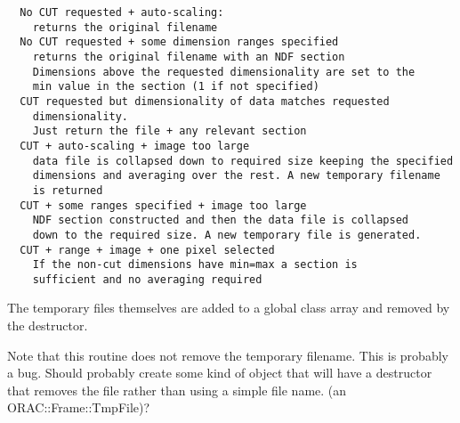 \begin{description}
\begin{verbatim}
  No CUT requested + auto-scaling:
    returns the original filename
  No CUT requested + some dimension ranges specified
    returns the original filename with an NDF section
    Dimensions above the requested dimensionality are set to the
    min value in the section (1 if not specified)
  CUT requested but dimensionality of data matches requested
    dimensionality.
    Just return the file + any relevant section
  CUT + auto-scaling + image too large
    data file is collapsed down to required size keeping the specified
    dimensions and averaging over the rest. A new temporary filename
    is returned
  CUT + some ranges specified + image too large
    NDF section constructed and then the data file is collapsed
    down to the required size. A new temporary file is generated.
  CUT + range + image + one pixel selected
    If the non-cut dimensions have min=max a section is
    sufficient and no averaging required
\end{verbatim}


The temporary files themselves are added to a global class
array and removed by the destructor.



Note that this routine does not remove the temporary filename.
This is probably a bug. Should probably create some kind of
object that will have a destructor that removes the file rather
than using a simple file name. (an ORAC::Frame::TmpFile)?

\end{description}
